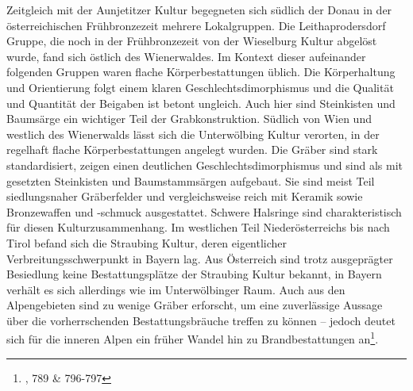 \documentclass[openany,twoside,twocolumn]{book}
\let\rmarkdownfootnote\footnote%
\def\footnote{\protect\rmarkdownfootnote}
\begin{document}
Zeitgleich mit der Aunjetitzer Kultur begegneten sich südlich der Donau
in der österreichischen Frühbronzezeit mehrere Lokalgruppen. Die
Leithaprodersdorf Gruppe, die noch in der Frühbronzezeit von der
Wieselburg Kultur abgelöst wurde, fand sich östlich des Wienerwaldes. Im
Kontext dieser aufeinander folgenden Gruppen waren flache
Körperbestattungen üblich. Die Körperhaltung und Orientierung folgt
einem klaren Geschlechtsdimorphismus und die Qualität und Quantität der
Beigaben ist betont ungleich. Auch hier sind Steinkisten und Baumsärge
ein wichtiger Teil der Grabkonstruktion. Südlich von Wien und westlich
des Wienerwalds lässt sich die Unterwölbing Kultur verorten, in der
regelhaft flache Körperbestattungen angelegt wurden. Die Gräber sind
stark standardisiert, zeigen einen deutlichen Geschlechtsdimorphismus
und sind als mit gesetzten Steinkisten und Baumstammsärgen aufgebaut.
Sie sind meist Teil siedlungsnaher Gräberfelder und vergleichsweise
reich mit Keramik sowie Bronzewaffen und -schmuck ausgestattet. Schwere
Halsringe sind charakteristisch für diesen Kulturzusammenhang. Im
westlichen Teil Niederösterreichs bis nach Tirol befand sich die
Straubing Kultur, deren eigentlicher Verbreitungsschwerpunkt in Bayern
lag. Aus Österreich sind trotz ausgeprägter Besiedlung keine
Bestattungsplätze der Straubing Kultur bekannt, in Bayern verhält es
sich allerdings wie im Unterwölbinger Raum. Auch aus den Alpengebieten
sind zu wenige Gräber erforscht, um eine zuverlässige Aussage über die
vorherrschenden Bestattungsbräuche treffen zu können -- jedoch deutet
sich für die inneren Alpen ein früher Wandel hin zu Brandbestattungen
an\footnote{\textcite{lubos_czech_2013}, 789 \& 796-797}.
\end{document}
